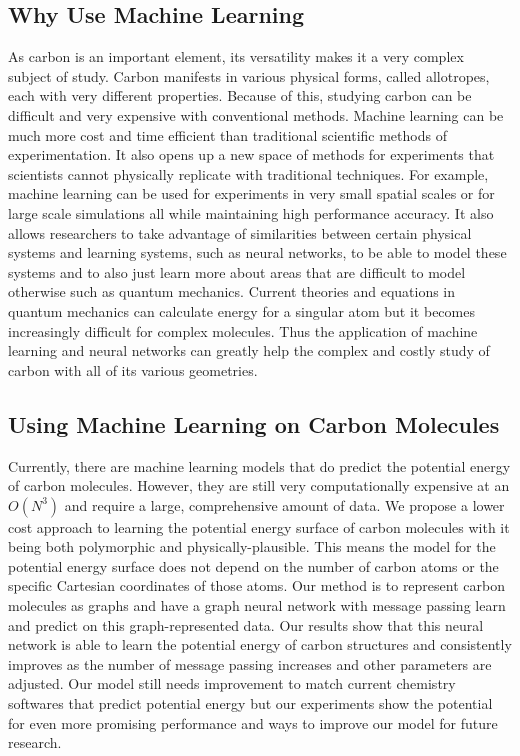\documentclass[12pt, abstract = true]{scrartcl}
\begin{document}
\subsection{Why Use Machine Learning}
As carbon is an important element, its versatility makes it a very
complex subject of study. Carbon manifests in various physical forms,
called allotropes, each with very different properties. Because of
this, studying carbon can be difficult and very expensive with conventional
methods. Machine learning can be much more cost and time efficient than traditional
scientific methods of experimentation. It also opens up a new space of methods for 
experiments that scientists cannot physically replicate with traditional techniques. 
For example, machine learning can be used for experiments in very small spatial
scales or for large scale simulations all while maintaining high
performance accuracy. It also allows researchers to take advantage of similarities 
between certain physical systems and learning systems, such as neural networks, to be 
able to model these systems and to also just learn more about areas that are difficult 
to model otherwise such as quantum mechanics. Current theories and equations in quantum 
mechanics can calculate energy for a singular atom but it becomes increasingly difficult 
for complex molecules. Thus the application of machine learning and neural networks 
can greatly help the complex and costly study of carbon with all of its various geometries.

\subsection{Using Machine Learning on Carbon Molecules}
Currently, there are machine learning models that do predict the potential energy of carbon molecules. However, they are still very computationally expensive at an $O(N^3)$ and require a large, comprehensive amount of data. We propose a lower cost approach to learning the potential energy surface of carbon molecules with it being both polymorphic and physically-plausible. This means the model for the potential energy surface does not depend on the number of carbon atoms or the specific Cartesian coordinates of those atoms. Our method is to represent carbon molecules as graphs and have a graph neural network with message passing learn and predict on this graph-represented data. Our results show that this neural network is able to learn the potential energy of carbon structures and consistently improves as the number of message passing increases and other parameters are adjusted. Our model still needs improvement to match current chemistry softwares that predict potential energy but our experiments show the potential for even more promising performance and ways to improve our model for future research.
\end{document}
